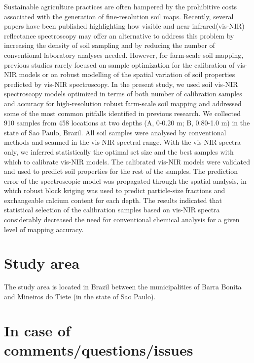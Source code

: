 \documentclass[]{book}
\begin{document}
Sustainable agriculture practices are often hampered by the prohibitive costs associated with the generation of fine-resolution soil maps. Recently, several papers have been published highlighting how visible and near infrared(vis-NIR) reflectance spectroscopy may offer an alternative to address this problem by increasing the density of soil sampling and by reducing the number of conventional laboratory analyses needed. However, for farm-scale soil mapping, previous studies rarely focused on sample optimization for the calibration of vis-NIR models or on robust modelling of the spatial variation of soil properties predicted by vis-NIR spectroscopy. In the present study, we used soil vis-NIR spectroscopy models optimized in terms of both number of calibration samples and accuracy for high-resolution robust farm-scale soil mapping and addressed some of the most common pitfalls identified in previous research. We collected 910 samples from 458 locations at two depths (A, 0-0.20 m; B, 0.80-1.0 m) in the state of Sao Paulo, Brazil. All soil samples were analysed by conventional methods and scanned in the vis-NIR spectral range. With the vis-NIR spectra only, we inferred statistically the optimal set size and the best samples with which to calibrate vis-NIR models. The calibrated vis-NIR models were validated and used to predict soil properties for the rest of the samples. The prediction error of the spectroscopic model was propagated through the spatial analysis, in which robust block kriging was used to predict particle-size fractions and exchangeable calcium content for each depth. The results indicated that statistical selection of the calibration samples based on vis-NIR spectra considerably decreased the need for conventional chemical analysis for a given level of mapping accuracy.

\hypertarget{study-area}{%
\section{Study area}\label{study-area}}

The study area is located in Brazil between the municipalities of Barra Bonita and Mineiros do Tiete (in the state of Sao Paulo).

\hypertarget{in-case-of-commentsquestionsissues}{%
\section{In case of comments/questions/issues}\label{in-case-of-commentsquestionsissues}}
\end{document}

